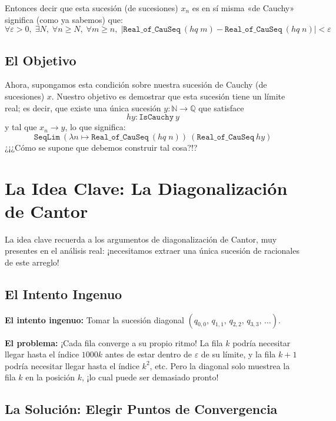 Entonces decir que esta sucesión (de sucesiones) $x_n$ es en sí misma «de Cauchy»
significa (como ya sabemos) que:
\[
  \forall \varepsilon > 0,\; \exists N,\; \forall n \geq N,\; \forall m \geq n,\;
  |\texttt{Real\_of\_CauSeq}\ (\mathit{hq}\; m) - \texttt{Real\_of\_CauSeq}\
  (\mathit{hq}\; n)| < \varepsilon
\]

\subsection{El Objetivo}

Ahora, supongamos esta condición sobre nuestra sucesión de Cauchy (de sucesiones)
$x$. Nuestro objetivo es demostrar que esta sucesión tiene un límite real; es decir,
que existe una única sucesión $y : \mathbb{N} \to \mathbb{Q}$ que satisface
\[
  \mathit{hy} : \texttt{IsCauchy}\ y
\]
y tal que $x_n \to y$, lo que significa:
\[
  \texttt{SeqLim}\ (\lambda n \mapsto \texttt{Real\_of\_CauSeq}\ (\mathit{hq}\; n))\
  (\texttt{Real\_of\_CauSeq}\ \mathit{hy})
\]
¿¡¿Cómo se supone que debemos construir tal cosa?!?

\section{La Idea Clave: La Diagonalización de Cantor}

La idea clave recuerda a los argumentos de diagonalización de Cantor, muy
presentes en el análisis real: ¡necesitamos extraer una única sucesión de racionales
de este arreglo!

\subsection{El Intento Ingenuo}

\textbf{El intento ingenuo:} Tomar la sucesión diagonal
$(q_{0,0},\, q_{1,1},\, q_{2,2},\, q_{3,3},\, \ldots)$.

\textbf{El problema:} ¡Cada fila converge a su propio ritmo! La fila $k$ podría
necesitar llegar hasta el índice $1000k$ antes de estar dentro de $\varepsilon$ de
su límite, y la fila $k+1$ podría necesitar llegar hasta el índice $k^2$, etc. Pero
la diagonal solo muestrea la fila $k$ en la posición $k$, ¡lo cual puede ser
demasiado pronto!

\subsection{La Solución: Elegir Puntos de Convergencia}

